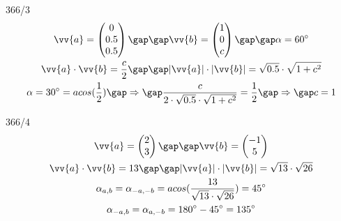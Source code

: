 \begin{exercise}{366/3}
  \begin{gather*}
    \vv{a} = \begin{pmatrix}0 \\ 0.5 \\ 0.5\end{pmatrix} \gap\gap \vv{b} = \begin{pmatrix}1 \\ 0 \\ c\end{pmatrix} \gap\gap \alpha = 60^\circ \\
    \vv{a} \cdot \vv{b} = \frac{c}{2} \gap\gap |\vv{a}| \cdot |\vv{b}| = \sqrt{0.5} \cdot \sqrt{1 + c^2} \\
    \alpha = 30^\circ = acos(\frac{1}{2}) \gap\Rightarrow\gap \frac{c}{2 \cdot \sqrt{0.5} \cdot \sqrt{1 + c^2}} = \frac{1}{2} \gap\Rightarrow\gap c = 1
  \end{gather*}
\end{exercise}
\begin{exercise}{366/4}
  \begin{gather*}
    \vv{a} = \begin{pmatrix}2 \\ 3\end{pmatrix} \gap\gap \vv{b} = \begin{pmatrix}-1 \\ 5\end{pmatrix} \\
    \vv{a} \cdot \vv{b} = 13 \gap\gap |\vv{a}| \cdot |\vv{b}| = \sqrt{13} \cdot \sqrt{26} \\
    \alpha_{a,b} = \alpha_{-a,-b} = acos(\frac{13}{\sqrt{13} \cdot \sqrt{26}}) = 45^\circ \\
    \alpha_{-a,b} = \alpha_{a,-b} = 180^\circ - 45^\circ = 135^\circ
  \end{gather*}
\end{exercise}
